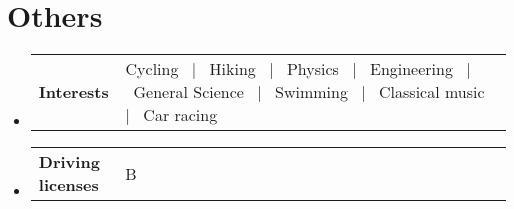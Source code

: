 \documentclass[a4paper,11pt]{article}
\newcommand{\resumeSectionTypeOne}[2]{
  \item\begin{tabular*}{0.99\textwidth}[t]{
    p{0.18\linewidth}p{0.81\linewidth}
  }
  \textbf{#1} & #2
  \end{tabular*}\vspace{-2pt}
}
\newcommand{\resumeHeadingListStart}{
  \begin{itemize}[leftmargin=0.15in, label={}]
}
\newcommand{\resumeHeadingListEnd}{\end{itemize}}
\begin{document}
\section{Others}
\resumeHeadingListStart{}
\resumeSectionTypeOne{Interests}{Cycling \ $|$ \ Hiking  \ $|$ \ Physics  \ $|$ \ Engineering \ $|$ \ General Science \ $|$ \ Swimming \ $|$ \ Classical music \ $|$ \ Car racing}
\resumeHeadingListEnd{}

\resumeHeadingListStart{}
\resumeSectionTypeOne{Driving licenses}{B}
\resumeHeadingListEnd{}
\end{document}
